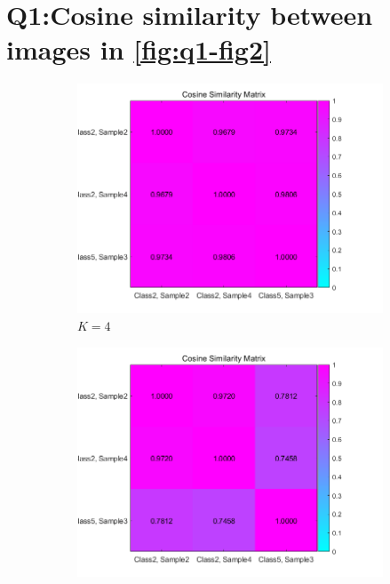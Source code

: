\section{Q1:Cosine similarity between images in \cref{fig:q1-fig2}}
\label{subsec:Q1_cossim}
\begin{figure}[htbp]
	\centering
	\begin{subfigure}[t]{0.25\linewidth}
		\centering
		\includegraphics[width=\linewidth]{image/q1-appendix/similarity_4.png} 
		\caption{$K=4$}
	\end{subfigure}%
	\hfill
	\begin{subfigure}[t]{0.25\linewidth}
		\centering
		\includegraphics[width=\linewidth]{image/q1-appendix/similarity_16.png} 

\end{subfigure}
\end{figure}
